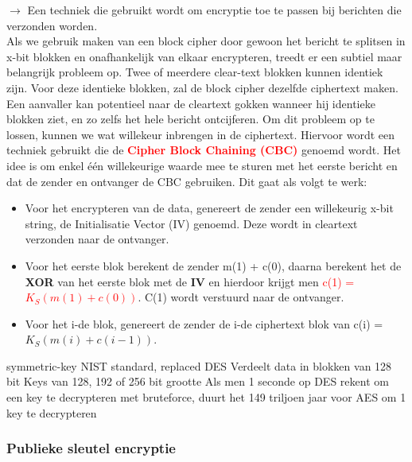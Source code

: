 
$\rightarrow$ Een techniek die gebruikt wordt om encryptie toe te passen bij berichten die verzonden worden. \\

\noindent Als we gebruik maken van een block cipher door gewoon het bericht te splitsen in x-bit blokken en onafhankelijk van elkaar encrypteren, treedt er een subtiel maar belangrijk probleem op. Twee of meerdere clear-text blokken kunnen identiek zijn. Voor deze identieke blokken, zal de block cipher dezelfde ciphertext maken. Een aanvaller kan potentieel naar de cleartext gokken wanneer hij identieke blokken ziet, en zo zelfs het hele bericht ontcijferen.
Om dit probleem op te lossen, kunnen we wat willekeur inbrengen in de ciphertext. Hiervoor wordt een techniek gebruikt die de \textcolor{red}{\textbf{Cipher Block Chaining (CBC)}} genoemd wordt. Het idee is om enkel één willekeurige waarde mee te sturen met het eerste bericht en dat de zender en ontvanger de CBC gebruiken. Dit gaat als volgt te werk:

\begin{itemize}

\item Voor het encrypteren van de data, genereert de zender een willekeurig x-bit string, de Initialisatie Vector (IV) genoemd. Deze wordt in cleartext verzonden naar de ontvanger.

\item Voor het eerste blok berekent de zender m(1) + c(0), daarna berekent het de \textbf{XOR} van het eerste blok met de \textbf{IV} en hierdoor krijgt men \textcolor{red}{c(1) = $K_S(m(1) + c(0))$}. C(1) wordt verstuurd naar de ontvanger.

\item Voor het i-de blok, genereert de zender de i-de ciphertext blok van c(i) = $K_S(m(i) + c(i-1))$.

\end{itemize}

\bi
\itf symmetric-key NIST standard, replaced DES
\itf Verdeelt data in blokken van 128 bit
\itf Keys van 128, 192 of 256 bit grootte
\itf Als men 1 seconde op DES rekent om een key te decrypteren met bruteforce, duurt het 149 triljoen jaar voor AES om 1 key te decrypteren
\ei


\subsubsection{Publieke sleutel encryptie}

